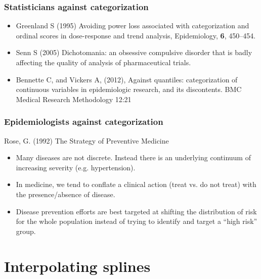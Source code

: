 \documentclass[aspectratio=169]{beamer}
\begin{document}
\begin{frame}
  \frametitle{Statisticians against categorization}
  \begin{itemize}
  \item Greenland S (1995) Avoiding power loss associated with
    categorization and ordinal scores in dose-response and trend
    analysis, Epidemiology, {\bf 6}, 450--454.
  \item Senn S (2005) Dichotomania: an obsessive compulsive disorder
    that is badly affecting the quality of analysis of pharmaceutical trials.
  \item Bennette C, and Vickers A, (2012), Against quantiles:
    categorization of continuous variables in epidemiologic research,
    and its discontents. BMC Medical Research Methodology 12:21
  \end{itemize}
\end{frame}

\begin{frame}
  \frametitle{Epidemiologists against categorization}

  Rose, G. (1992) The Strategy of Preventive Medicine
  \begin{itemize}
  \item Many diseases are not discrete. Instead there is an underlying
    continuum of increasing severity (e.g. hypertension).
  \item In medicine, we tend to conflate a clinical action (treat
    vs. do not treat) with the presence/absence of disease.
  \item Disease prevention efforts are best targeted at shifting the
    distribution of risk for the whole population instead of trying to
    identify and target a ``high risk'' group.
  \end{itemize}

\end{frame}

\section{Interpolating splines}
\end{document}

